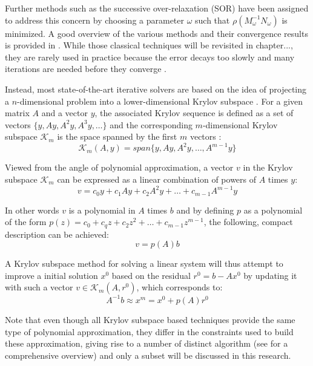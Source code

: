 \noindent Further methods such as the successive over-relaxation (SOR) have been assigned to address this concern by choosing a parameter $\omega$ such that $\rho(M_\omega^{-1}N_\omega)$ is minimized. A good overview of the various methods and their convergence results is provided in \cite{saad_iterative_2003}. 
While those classical techniques will be revisited in chapter..., they are rarely used in practice because the error decays too slowly and many iterations are needed before they converge \cite{strang_introduction_2009}.

Instead, most state-of-the-art iterative solvers are based on the idea of projecting a $n$-dimensional problem into a lower-dimensional Krylov subspace \cite{golub_matrix_2013}. For a given matrix $A$ and a vector $y$, the associated Krylov sequence is defined as a set of vectors $\{y, Ay, A^2y, A^3y, \dots\}$ and the corresponding $m$-dimensional Krylov subspace $\mathcal{K}_m$ is the space spanned by the first $m$ vectors \cite{trefethen_numerical_1997}:
\begin{equation}
    \mathcal{K}_m(A,y) = span\{y, Ay, A^2y, \dots, A^{m-1}y\}
\end{equation}

\noindent Viewed from the angle of polynomial approximation, a vector $v$ in the Krylov subspace $\mathcal{K}_m$ can be expressed as a linear combination of powers of $A$ times $y$:
\begin{equation}
\label{eqn:poly1}
    v = c_0y+c_1Ay+c_2A^2y+\dots+c_{m-1}A^{m-1}y
\end{equation}

\noindent In other words $v$ is a polynomial in $A$ times $b$ and by defining $p$ as a polynomial of the form $p(z) = c_0+c_qz+c_2z^2+\dots+c_{m-1}z^{m-1}$, the following, compact description can be achieved:
\begin{equation}
\label{eqn:poly2}
v=p(A)b    
\end{equation}

\noindent A Krylov subspace method for solving a linear system will thus attempt to improve a initial solution $x^0$ based on the residual $r^0 = b-Ax^0$ by updating it with such a vector $v \in \mathcal{K}_m(A, r^0)$, which corresponds to:
\begin{equation}
    A^{-1}b \approx x^m = x^0+p(A)r^0
\end{equation}

\noindent Note that even though all Krylov subspace based techniques provide the same type of polynomial approximation, they differ in the constraints used to build these approximation, giving rise to a number of distinct algorithm (see \cite{saad_iterative_2003} for a comprehensive overview) and only a subset will be discussed in this research.



